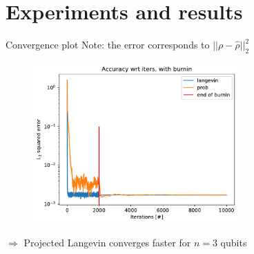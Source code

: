 \documentclass{beamer}
\begin{document}
\section{Experiments and results}


\begin{frame}{Convergence plot}
Note: the error corresponds to $||\rho - \hat \rho||_2^2$
\begin{figure}[H]
        \centering
        \includegraphics[width=0.7\textwidth]{figures/experiments/baseline/iters_acc_comp_iters_no_avg-1.png}
    
\end{figure}
$\Longrightarrow$ Projected Langevin converges faster for $n=3$ qubits
\end{frame}
\end{document}
